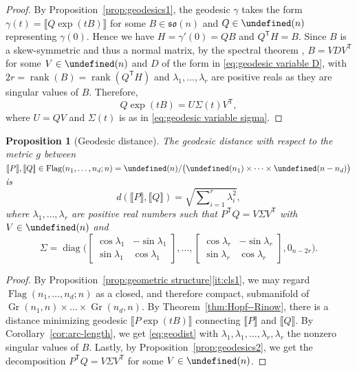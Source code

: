 \documentclass[11pt,reqno]{amsart}%
\newtheorem{proposition}[theorem]{Proposition}
\theoremstyle{definition}
\theoremstyle{remark}
\newcommand{\tp}{{\scriptscriptstyle\mathsf{T}}}
\newcommand{\lb}{\llbracket}
\newcommand{\rb}{\rrbracket}
\let\O\undefined
\DeclareMathOperator{\Gr}{Gr}
\DeclareMathOperator{\Flag}{Flag}
\DeclareMathOperator{\O}{O}
\DeclareMathOperator{\rank}{rank}
\begin{document}
\begin{proof}
By Proposition~\ref{prop:geodesics1}, the geodesic $\gamma$ takes the form $\gamma(t) = \lb Q \exp(tB) \rb$ for some $B\in \mathfrak{so}(n)$ and $Q \in \O(n)$ representing $\gamma(0)$. Hence we have $H = \gamma'(0) = QB $ and $Q^\tp  H = B$. Since $B$ is a skew-symmetric and thus a normal matrix, by the spectral theorem \cite[Theorem~7.25]{Sheldon1997}, $B = V D V^\tp $ for some $V\in \O(n)$ and $D$ of the form in \eqref{eq:geodesic variable D}, with $2r = \rank(B) =  \rank(Q^\tp H) $ and $\lambda_1,\dots,\lambda_r$ are positive reals as they are singular values of $B$. Therefore,
\[
Q \exp(tB) = U \Sigma(t) V^\tp ,
\]
where $U = QV$ and $\Sigma(t)$ is as in \eqref{eq:geodesic variable sigma}.
\end{proof}

\begin{proposition}[Geodesic distance]\label{prop:geodist}
The geodesic distance with respect to the metric $g$ between $\lb P \rb, \lb Q \rb \in  \Flag(n_1,\dots, n_d;n) = \O(n)/\bigl(\O(n_1)\times \dots \times \O(n-n_d)\bigr)$ is
\begin{equation}\label{eq:geodist}
d(\lb P \rb,\lb Q \rb) = \sqrt{\sum\nolimits_{i=1}^r \lambda_i^2},
\end{equation}
where $\lambda_1,\dots, \lambda_r$ are positive real numbers such that $P^\tp  Q = V \Sigma V^\tp$ with $V \in \O(n)$ and 
\[
\Sigma = \operatorname{diag} \biggl(
\begin{bmatrix}
\cos \lambda_1 & -\sin \lambda_1 \\
\sin \lambda_1 & \cos \lambda_1 
\end{bmatrix}, 
\dots, 
\begin{bmatrix}
\cos \lambda_r & -\sin \lambda_r \\
\sin \lambda_r & \cos \lambda_r 
\end{bmatrix}, 
0_{n-2r}
\biggr).
\]
\end{proposition}
\begin{proof}
By Proposition~\ref{prop:geometric structure}\eqref{it:cls1}, we may regard $\Flag(n_1,\dots, n_d;n)$ as a closed, and therefore compact, submanifold of $\Gr(n_1,n)\times \dots \times \Gr(n_d,n)$. By Theorem~\ref{thm:Hopf--Rinow}, there is a distance minimizing geodesic $\lb P\exp(tB) \rb$ connecting $\lb P \rb$ and $\lb Q \rb$. By Corollary~\ref{cor:arc-length}, we get \eqref{eq:geodist} with $\lambda_1,\lambda_1,\dots,\lambda_r,\lambda_r$  the nonzero singular values of $B$. Lastly, by Proposition~\ref{prop:geodesics2}, we get the decomposition $P^\tp Q = V \Sigma V^\tp $ for some $V\in \O(n)$.
\end{proof}
\end{document}
